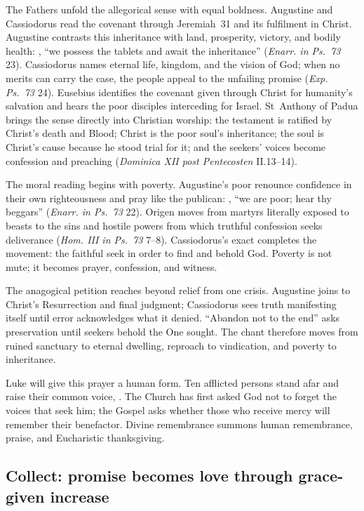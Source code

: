 The Fathers unfold the allegorical sense with equal boldness. Augustine and
Cassiodorus read the covenant through Jeremiah~31 and its fulfilment in Christ.
Augustine contrasts this inheritance with land,
prosperity, victory, and bodily health: , ``we possess the tablets and await the inheritance''
(\emph{Enarr. in Ps.~73} 23). Cassiodorus names eternal life, kingdom, and the
vision of God; when no merits can carry the case, the people appeal to the
unfailing promise (\emph{Exp. Ps.~73} 24). Eusebius identifies the covenant
given through Christ for humanity's salvation and hears the poor disciples
interceding for Israel. St~Anthony of Padua brings the sense directly into
Christian worship: the testament is ratified by Christ's death and Blood;
Christ is the poor soul's inheritance; the soul is Christ's cause because he
stood trial for it; and the seekers' voices become confession and preaching
(\emph{Dominica XII post Pentecosten} II.13--14).

The moral reading begins with poverty. Augustine's poor renounce confidence in
their own righteousness and pray like the publican: , ``we are poor; hear thy beggars'' (\emph{Enarr. in
Ps.~73} 22). Origen moves from martyrs literally exposed to beasts to the sins
and hostile powers from which truthful confession seeks deliverance
(\emph{Hom. III in Ps.~73} 7--8). Cassiodorus's exact  completes
the movement: the faithful seek in order to find and behold God. Poverty is not
mute; it becomes prayer, confession, and witness.

The anagogical petition reaches beyond relief from one crisis. Augustine joins
 to Christ's Resurrection and final judgment; Cassiodorus sees
truth manifesting itself until error acknowledges what it denied. ``Abandon
not to the end'' asks preservation until seekers behold the One sought. The
chant therefore moves from ruined sanctuary to eternal dwelling, reproach to
vindication, and poverty to inheritance.

Luke will give this prayer a human form. Ten afflicted persons stand afar and
raise their common voice, . The Church
has first asked God not to forget the voices that seek him; the Gospel asks
whether those who receive mercy will remember their benefactor. Divine
remembrance summons human remembrance, praise, and Eucharistic thanksgiving.

\subsection*{Collect: promise becomes love through grace-given increase\enspace{}}

